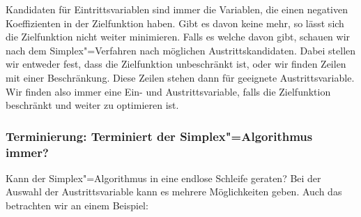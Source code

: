 Kandidaten für Eintrittsvariablen sind immer die Variablen, die einen negativen Koeffizienten in der Zielfunktion haben. Gibt es davon keine mehr, so lässt sich die Zielfunktion nicht weiter minimieren. Falls es welche davon gibt, schauen wir nach dem Simplex"=Verfahren nach möglichen Austrittskandidaten. Dabei stellen wir entweder fest, dass die Zielfunktion unbeschränkt ist, oder wir finden Zeilen mit einer Beschränkung. Diese Zeilen stehen dann für geeignete Austrittsvariable. Wir finden also immer eine Ein- und Austrittsvariable, falls die Zielfunktion beschränkt und weiter zu optimieren ist.

\subsubsection{Terminierung: Terminiert der Simplex"=Algorithmus immer?}
Kann der Simplex"=Algorithmus in eine endlose Schleife geraten? Bei der Auswahl der Austrittsvariable kann es mehrere Möglichkeiten geben. Auch das betrachten wir an einem Beispiel:

